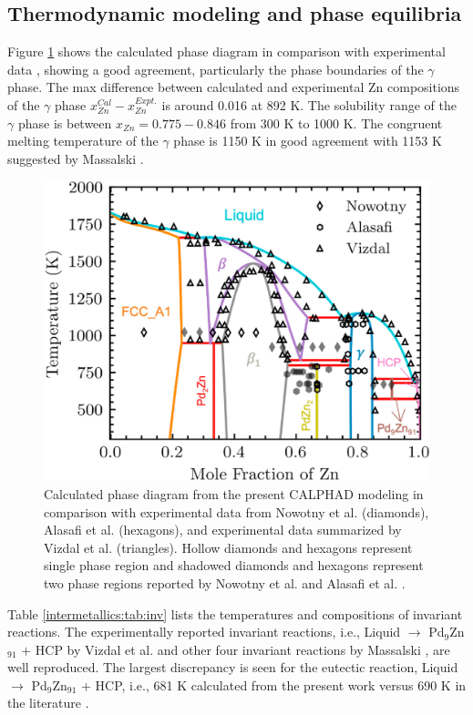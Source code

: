 \subsection{Thermodynamic modeling and phase equilibria} \label{intermetallics:ssec:PdZneq}
Figure \ref{Intermetallics:fig:PdZnPhaseDiagram} shows the calculated phase diagram in comparison with experimental data \cite{vizdal2006experimental, nowotny1951beitrag, alasafi1978mischung}, showing a good agreement, particularly the phase boundaries of the $\gamma$ phase. The max difference between calculated and experimental Zn compositions of the $\gamma$ phase  $x_{Zn}^{Cal}-x_{Zn}^{Expt.}$ is around 0.016 at 892 K. The solubility range of the $\gamma$ phase is between $x_{Zn} = 0.775 - 0.846$ from 300 K to 1000 K. The congruent melting temperature of the $\gamma$ phase is 1150 K in good agreement with 1153 K suggested by Massalski \cite{massalski1986binary}.\\

\begin{figure}[H]
    \centering
    \includegraphics[width=0.6\linewidth]{intermetallics/Intermetallics-PdZnPhaseDiagram.jpg}
    \caption{Calculated phase diagram from the present CALPHAD modeling in comparison with experimental data from Nowotny et al. \cite{nowotny1951beitrag} (diamonds), Alasafi et al. \cite{alasafi1978mischung} (hexagons), and experimental data summarized by Vizdal et al. \cite{vizdal2006experimental} (triangles). Hollow diamonds and hexagons represent single phase region and shadowed diamonds and hexagons represent two phase regions reported by Nowotny et al. \cite{nowotny1951beitrag} and Alasafi et al. \cite{alasafi1978mischung}.}
    \label{Intermetallics:fig:PdZnPhaseDiagram}
\end{figure} 

Table \ref{intermetallics:tab:inv} lists the temperatures and compositions of invariant reactions. The experimentally reported invariant reactions, i.e., Liquid $\rightarrow$ Pd$_9$Zn$_{91}$ $+$ HCP by Vizdal et al. \cite{vizdal2006experimental} and other four invariant reactions by Massalski \cite{massalski1986binary}, are well reproduced. The largest discrepancy is seen for the eutectic reaction, Liquid $\rightarrow$ Pd$_9$Zn$_{91}$ + HCP, i.e., 681 K calculated from the present work versus 690 K in the literature \cite{vizdal2006experimental}.

